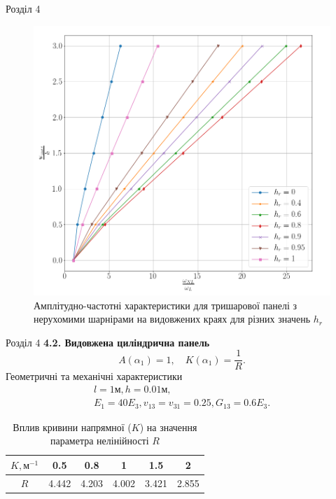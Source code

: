 \documentclass[8pt]{beamer}
\numberwithin{figure}{section}
\numberwithin{equation}{section}
\numberwithin{table}{section}
\begin{document}
\begin{frame}{Розділ 4}

\begin{figure}
	\includegraphics[scale=0.2]{pic/AFR_layered2.png}
		\caption{Амплітудно-частотні характеристики для тришарової панелі з нерухомими шарнірами на видовжених краях для різних значень $h_{r}$}
		\label{fig:AFR_layers}
\end{figure}


\end{frame}

\begin{frame}{Розділ 4}
\textbf{4.2. Видовжена циліндрична панель}
\begin{equation}
A\left( \alpha_1 \right)=1, \quad K\left( \alpha_1 \right)=\frac{1}{R}.
\end{equation}
Геометричні та механічні характеристики
\begin{equation}
\begin{gathered}
l=1\text{м}, h=0.01\text{м},\\
E_1=40E_3, v_{13}=v_{31}=0.25, G_{13}=0.6E_3.
\end{gathered}
\end{equation}

\begin{table}[h!]
\centering
 \begin{tabular}{| c | c | c | c | c | c |} 
 \hline
 $K, м^{-1}$ & 0.5 & 0.8 & 1 & 1.5 & 2 \\ 
  \hline
 $R$ & 4.442 & 4.203 & 4.002 & 3.421 & 2.855 \\
   \hline
\end{tabular}
\caption{Вплив кривини напрямної ($K$) на значення параметра нелінійності $R$}
\label{table:4}
\end{table}
\end{frame}
\end{document}
